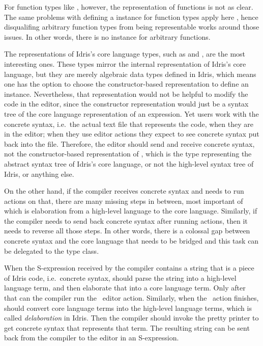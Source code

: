 For function types like \mbox{}, however, the \sexp{}
representation of functions is not as clear. The same problems with
defining a  instance for function types apply here \cite{showfunction},
hence disqualifing arbitrary function types from being \sexp{} representable
works around those issues. In other words, there is no  instance
for arbitrary functions.

The \sexp{} representations of Idris's core language types, such as \TT{} and
\TyDecl{}, are the most interesting ones. These types mirror the internal
representation of Idris's core language, but they are merely algebraic data
types defined in Idris, which means one has the option to choose the
constructor-based representation to define an \Editorable{} instance.
Nevertheless, that representation would not be helpful to modify the code in
the editor, since the constructor representation would just be a syntax tree of
the core language representation of an expression. Yet users work with the
concrete syntax, i.e.\ the actual text file that represents the code, when they
are in the editor; when they use editor actions they expect to see concrete
syntax put back into the file. Therefore, the editor should send and receive
concrete syntax, not the constructor-based representation of \TT{}, which is the type
representing the abstract syntax tree of Idris's core language, or not the
high-level syntax tree of Idris, or anything else.

On the other hand, if the compiler receives concrete syntax and needs to run \Elab{}
actions on that, there are many missing steps in between, most important of
which is elaboration from a high-level language to the core language.
Similarly, if the compiler needs to send back concrete syntax after
running \Elab{} actions, then it needs to reverse all those steps.
In other words, there is a colossal gap between concrete syntax and the core
language that needs to be bridged and this task can be delegated to the
\Editorable{} type class.

When the S-expression received by the compiler contains a string that is a
piece of Idris code, i.e.\ concrete syntax,  should parse the
string into a high-level language term, and then elaborate that into a core
language term. Only after that can the compiler run the \Elab\ editor action.
Similarly, when the \Elab\ action finishes,  should convert core
language terms into the high-level language terms, which is called
\emph{delaboration} in Idris. Then the compiler should invoke the pretty
printer to get concrete syntax that represents that term. The resulting string
can be sent back from the compiler to the editor in an S-expression.

